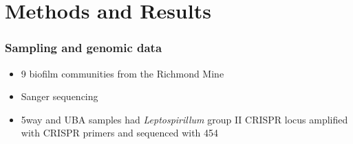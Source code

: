 \documentclass[10pt]{beamer}
\begin{document}

\section{Methods and Results}

\begin{frame}[fragile]
	\frametitle{Sampling and genomic data}
    
	\begin{itemize}
		\item 9 biofilm communities from the Richmond Mine
        \item Sanger sequencing
        \item 5way and UBA samples had \emph{Leptospirillum} group II CRISPR locus amplified with CRISPR primers and sequenced with 454
	\end{itemize}

\end{frame}

\end{document}
